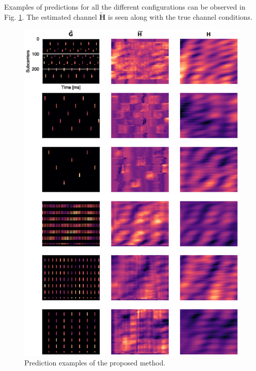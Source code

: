Examples of predictions for all the different configurations can be observed in Fig. \ref{fig:prediction_example_grid}. The estimated channel $\mathbf{\widetilde{H}}$ is seen along with the true channel conditions.
\begin{figure}
    \centering
    \includegraphics[width=1.1\textwidth]{chapters/part_uplink/figures/results/channel_estimation/prediction_example_grid.eps}
    \caption{Prediction examples of the proposed method.}
    \label{fig:prediction_example_grid}
\end{figure}

